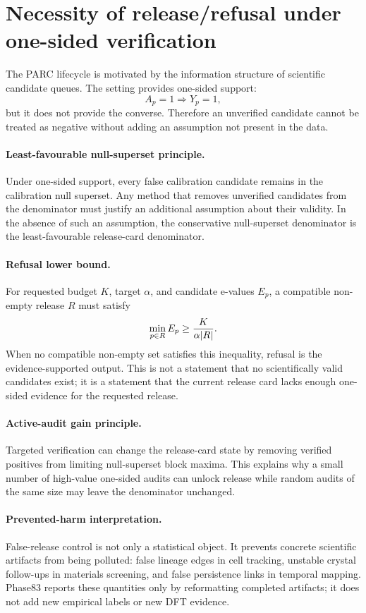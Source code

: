 \section{Necessity of release/refusal under one-sided verification}
\label{sec:necessity-prevented-harm}

The PARC lifecycle is motivated by the information structure of scientific
candidate queues.  The setting provides one-sided support:
\[
  A_p=1 \Rightarrow Y_p=1 ,
\]
but it does not provide the converse.  Therefore an unverified candidate cannot
be treated as negative without adding an assumption not present in the data.

\paragraph{Least-favourable null-superset principle.}
Under one-sided support, every false calibration candidate remains in the
calibration null superset.  Any method that removes unverified candidates from
the denominator must justify an additional assumption about their validity.  In
the absence of such an assumption, the conservative null-superset denominator
is the least-favourable release-card denominator.

\paragraph{Refusal lower bound.}
For requested budget \(K\), target \(\alpha\), and candidate e-values \(E_p\),
a compatible non-empty release \(R\) must satisfy
\[
  \min_{p\in R} E_p \ge {K \over \alpha |R|}.
\]
When no compatible non-empty set satisfies this inequality, refusal is the
evidence-supported output.  This is not a statement that no scientifically
valid candidates exist; it is a statement that the current release card lacks
enough one-sided evidence for the requested release.

\paragraph{Active-audit gain principle.}
Targeted verification can change the release-card state by removing verified
positives from limiting null-superset block maxima.  This explains why a small
number of high-value one-sided audits can unlock release while random audits of
the same size may leave the denominator unchanged.

\paragraph{Prevented-harm interpretation.}
False-release control is not only a statistical object.  It prevents concrete
scientific artifacts from being polluted: false lineage edges in cell tracking,
unstable crystal follow-ups in materials screening, and false persistence links
in temporal mapping.  Phase83 reports these quantities only by reformatting
completed artifacts; it does not add new empirical labels or new DFT evidence.

